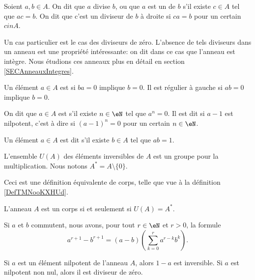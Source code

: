 \begin{definition}\label{DiviseursAnneau}
	Soient \( a, b \in A \). On dit que $a$ divise $b$, ou que $a$ est un  de $b$ s'il existe \( c \in A \) tel que \( ac = b \). On dit que c'est un diviseur de $b$ à droite si \( ca = b \) pour un certain \( c in A \).
\end{definition}
Un cas particulier est le cas des diviseurs de zéro. L'absence de tels diviseurs dans un anneau est une propriété intéressante: on dit dans ce cas que l'anneau est intègre. Nous étudions ces anneaux plus en détail en section \ref{SECAnneauxIntegres}.

Un élément \( a\in A\) est  si \( ba=0\) implique \( b=0\). Il est régulier à gauche si \( ab=0\) implique \( b=0\).

\begin{definition}
	On dit que \( a \in A \) est  s'il existe \( n \in \eN \) tel que \( a^n = 0 \). Il est dit  si \( a-1\) est nilpotent, c'est à dire si \( (a-1)^n =0\) pour un certain \( n \in \eN \).
	
	Un élément \( a \in A \) est dit  s'il existe \( b \in A \) tel que \( ab = 1 \).
\end{definition}

L'ensemble \( U(A)\) des éléments inversibles de \( A\) est un groupe pour la multiplication. Nous notons \( A^*=A\setminus\{ 0 \}\).

Ceci est une définition équivalente de corps, telle que vue à la définition \ref{DefTMNooKXHUd}.
\begin{proposition}
    L'anneau $A$ est un corps si et seulement si \( U(A) = A^* \).
\end{proposition}

\begin{lemma}
    Si \( a\) et \( b\) commutent, nous avons, pour tout \( r \in \eN \) et \( r > 0\), la formule
    \begin{equation}        \label{Eqarpurmkbk}
        a^{r+1}-b^{r+1}=(a-b)\left(\sum_{k=0}^ra^{r-k}b^k\right).
    \end{equation}
\end{lemma}

\begin{proposition}
    Si \( a\) est un élément nilpotent de l'anneau \( A\), alors \( 1-a\) est inversible. Si \( a\) est nilpotent non nul, alors il est diviseur de zéro.
\end{proposition}

